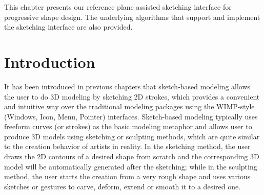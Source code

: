 This chapter presents our reference plane assisted sketching
interface for progressive shape design. The underlying algorithms
that support and implement the sketching interface are also
provided.

\section{Introduction}
\label{ch3:sec:intro}


It has been introduced in previous chapters that sketch-based
modeling allows the user to do 3D modeling by sketching 2D strokes,
which provides a convenient and intuitive way over the traditional
modeling packages using the WIMP-style (Windows, Icon, Menu,
Pointer) interfaces. Sketch-based modeling typically uses freeform
curves (or strokes) as the basic modeling metaphor and allows user
to produce 3D models using sketching or sculpting methods, which are
quite similar to the creation behavior of artists in reality. In the
sketching method, the user draws the 2D contours of a desired shape
from scratch and the corresponding 3D model will be automatically
generated after the sketching; while in the sculpting method, the
user starts the creation from a very rough shape and uses various
sketches or gestures to carve, deform, extend or smooth it to a
desired one.

